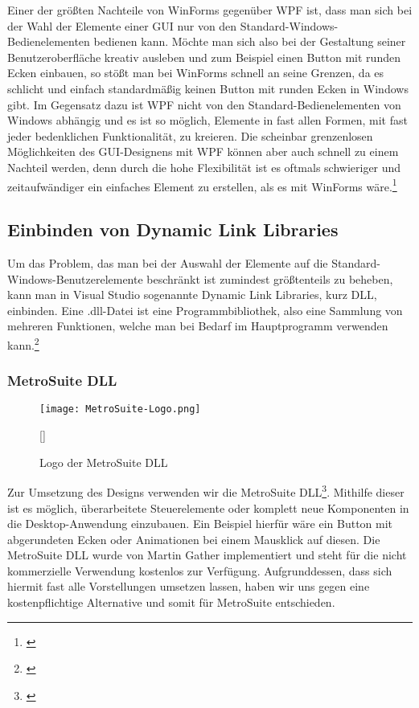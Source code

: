 Einer der größten Nachteile von WinForms gegenüber WPF ist, dass man sich bei der Wahl der Elemente einer GUI nur von den Standard-Windows-Bedienelementen bedienen kann. Möchte man sich also bei der Gestaltung seiner Benutzeroberfläche kreativ ausleben und zum Beispiel einen Button mit runden Ecken einbauen, so stößt man bei WinForms schnell an seine Grenzen, da es schlicht und einfach standardmäßig keinen Button mit runden Ecken in Windows gibt. Im Gegensatz dazu ist WPF nicht von den Standard-Bedienelementen von Windows abhängig und es ist so möglich, Elemente in fast allen Formen, mit fast jeder bedenklichen Funktionalität, zu kreieren. Die scheinbar grenzenlosen Möglichkeiten des GUI-Designens mit WPF können aber auch schnell zu einem Nachteil werden, denn durch die hohe Flexibilität ist es oftmals schwieriger und zeitaufwändiger ein einfaches Element zu erstellen, als es mit WinForms wäre.\footnote[3]{\cite[Vgl.][]{Vergleich}}

\subsection{Einbinden von Dynamic Link Libraries}

 Um das Problem, das man bei der Auswahl der Elemente auf die Standard-Windows-Benutzerelemente beschränkt ist zumindest größtenteils zu beheben, kann man in Visual Studio sogenannte Dynamic Link Libraries, kurz DLL, einbinden. Eine .dll-Datei ist eine Programmbibliothek, also eine Sammlung von mehreren Funktionen, welche man bei Bedarf im Hauptprogramm verwenden kann.\footnote[1]{\cite[Vgl.][]{DLL}}

\subsubsection{MetroSuite DLL}

\begin{figure}[H]
    \centering
    \texttt{[image: MetroSuite-Logo.png]}
    \caption[MetroSuiteDLL-Logo]{Logo der MetroSuite DLL}[\cite{MetroSuite1}]
\end{figure}
\noindent 
Zur Umsetzung des Designs verwenden wir die MetroSuite DLL\footnote[2]{\cite[Vgl.][]{MetroSuite2}}. Mithilfe dieser ist es möglich, überarbeitete Steuerelemente oder komplett neue Komponenten in die Desktop-Anwendung einzubauen. Ein Beispiel hierfür wäre ein Button mit abgerundeten Ecken oder Animationen bei einem Mausklick auf diesen. Die MetroSuite DLL wurde von Martin Gather implementiert und steht für die nicht kommerzielle Verwendung kostenlos zur Verfügung. Aufgrunddessen, dass sich hiermit fast alle Vorstellungen umsetzen lassen, haben wir uns gegen eine kostenpflichtige Alternative und somit für MetroSuite entschieden.

